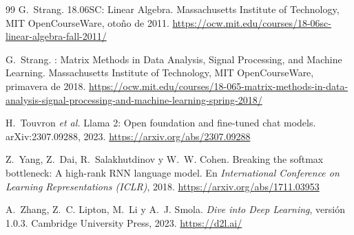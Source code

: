 \begin{thebibliography}{99}
G.~Strang.
\newblock 18.06SC: Linear Algebra.
\newblock Massachusetts Institute of Technology, MIT OpenCourseWare, otoño de 2011.
\newblock \url{https://ocw.mit.edu/courses/18-06sc-linear-algebra-fall-2011/}

G.~Strang.
: Matrix Methods in Data Analysis, Signal Processing, and Machine Learning.
\newblock Massachusetts Institute of Technology, MIT OpenCourseWare, primavera de 2018.
\newblock \url{https://ocw.mit.edu/courses/18-065-matrix-methods-in-data-analysis-signal-processing-and-machine-learning-spring-2018/}

H.~Touvron \emph{et al.}
\newblock Llama 2: Open foundation and fine-tuned chat models.
\newblock arXiv:2307.09288, 2023.
\newblock \url{https://arxiv.org/abs/2307.09288}

Z.~Yang, Z.~Dai, R.~Salakhutdinov y W.~W. Cohen.
\newblock Breaking the softmax bottleneck: A high-rank RNN language model.
\newblock En \emph{International Conference on Learning Representations (ICLR)}, 2018.
\newblock \url{https://arxiv.org/abs/1711.03953}

A.~Zhang, Z.~C. Lipton, M.~Li y A.~J. Smola.
\newblock \emph{Dive into Deep Learning}, versión 1.0.3.
\newblock Cambridge University Press, 2023.
\newblock \url{https://d2l.ai/}

\end{thebibliography}
